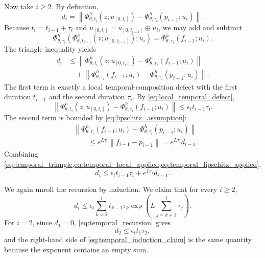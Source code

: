 \documentclass{article}
\theoremstyle{plain}
\theoremstyle{definition}
\theoremstyle{remark}
\newcommand{\PhiOp}{\Phi}
\newcommand{\norm}[1]{\left\lVert #1 \right\rVert}
\begin{document}
Now take $i\ge2$. By definition,
\begin{equation}
d_i
=
\norm{
\PhiOp^{h}_{\theta,t_i}(z;u_{[0,t_i]})
-
\PhiOp^{h}_{\theta,\tau_i}(p_{i-1};u_i)
}.
\end{equation}
Because $t_i=t_{i-1}+\tau_i$ and
$u_{[0,t_i]}=u_{[0,t_{i-1}]}\oplus u_i$, we may add and subtract
\begin{equation}
\PhiOp^{h}_{\theta,\tau_i}
\left(
\PhiOp^{h}_{\theta,t_{i-1}}(z;u_{[0,t_{i-1}]});
 u_i
\right)
=
\PhiOp^{h}_{\theta,\tau_i}(f_{i-1};u_i).
\end{equation}
The triangle inequality yields
\begin{align}
d_i
&\le
\norm{
\PhiOp^{h}_{\theta,t_i}(z;u_{[0,t_i]})
-
\PhiOp^{h}_{\theta,\tau_i}(f_{i-1};u_i)
}
\nonumber\\
&\quad+
\norm{
\PhiOp^{h}_{\theta,\tau_i}(f_{i-1};u_i)
-
\PhiOp^{h}_{\theta,\tau_i}(p_{i-1};u_i)
}.
\label{eq:temporal_triangle}
\end{align}
The first term is exactly a local temporal-composition defect with the first duration $t_{i-1}$ and the second duration $\tau_i$. By \cref{eq:local_temporal_defect},
\begin{equation}
\norm{
\PhiOp^{h}_{\theta,t_i}(z;u_{[0,t_i]})
-
\PhiOp^{h}_{\theta,\tau_i}(f_{i-1};u_i)
}
\le
\epsilon_t t_{i-1}\tau_i.
\label{eq:temporal_local_applied}
\end{equation}
The second term is bounded by \cref{eq:lipschitz_assumption}:
\begin{align}
&\norm{
\PhiOp^{h}_{\theta,\tau_i}(f_{i-1};u_i)
-
\PhiOp^{h}_{\theta,\tau_i}(p_{i-1};u_i)
}
\nonumber\\
&\qquad\le
e^{L\tau_i}\norm{f_{i-1}-p_{i-1}}
=e^{L\tau_i}d_{i-1}.
\label{eq:temporal_lipschitz_applied}
\end{align}
Combining \cref{eq:temporal_triangle,eq:temporal_local_applied,eq:temporal_lipschitz_applied},
\begin{equation}
d_i
\le
\epsilon_t t_{i-1}\tau_i
+e^{L\tau_i}d_{i-1}.
\label{eq:temporal_recursion}
\end{equation}

We again unroll the recursion by induction. We claim that for every $i\ge2$,
\begin{equation}
d_i
\le
\epsilon_t
\sum_{k=2}^{i}
 t_{k-1}\tau_k
\exp\!\left(
L\sum_{j=k+1}^{i}\tau_j
\right).
\label{eq:temporal_induction_claim}
\end{equation}
For $i=2$, since $d_1=0$, \cref{eq:temporal_recursion} gives
\begin{equation}
d_2\le\epsilon_t t_1\tau_2,
\end{equation}
and the right-hand side of \cref{eq:temporal_induction_claim} is the same quantity because the exponent contains an empty sum.
\end{document}
